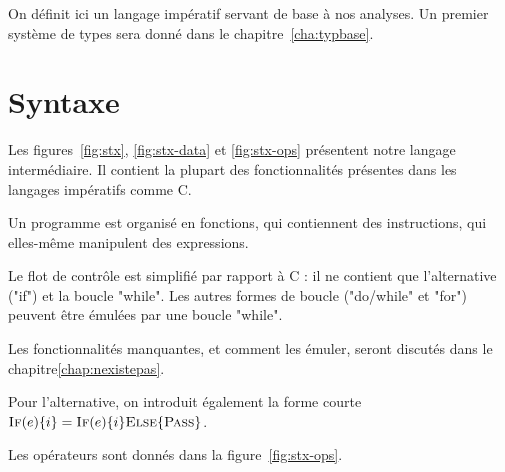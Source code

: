 On définit ici un langage impératif servant de base à nos analyses. Un premier
système de types sera donné dans le chapitre~\ref{cha:typbase}.

\section{Syntaxe}

Les figures~\ref{fig:stx}, \ref{fig:stx-data} et \ref{fig:stx-ops} présentent
notre langage intermédiaire. Il contient la plupart des fonctionnalités
présentes dans les langages impératifs comme C.

Un programme est organisé en fonctions, qui contiennent des instructions, qui
elles-même manipulent des expressions.

Le flot de contrôle est simplifié par rapport à C : il ne contient que
l'alternative ("if") et la boucle "while". Les autres formes de boucle
("do/while" et "for") peuvent être émulées par une boucle "while".

Les fonctionnalités manquantes, et comment les émuler, seront discutés dans le
chapitre\ref{chap:nexistepas}. %

Pour l'alternative, on introduit également la forme courte $\textsc{If}(e) \{ i \} =
\textsc{If}(e) \{ i \} \textsc{Else} \{ \textsc{Pass} \}$.

Les opérateurs sont donnés dans la figure~\ref{fig:stx-ops}.

